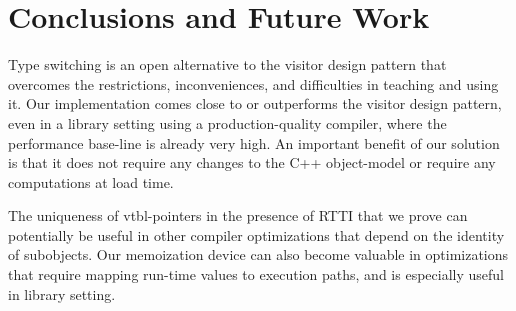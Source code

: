 \section{Conclusions and Future Work} %
\label{sec:cc}

Type switching is an open alternative to the visitor design pattern that overcomes 
the restrictions, inconveniences, and difficulties in teaching and using 
it. Our implementation comes close to or 
outperforms the visitor design pattern, even in a library setting 
using a production-quality compiler, where the performance base-line is 
already very high. An important benefit of our solution is that it does not 
require any changes to the C++ object-model or require any computations at load 
time.

The uniqueness of vtbl-pointers in the presence of RTTI that we prove can 
potentially be useful in other compiler optimizations that depend on the 
identity of subobjects. Our memoization device can also become valuable in 
optimizations that require mapping run-time values to execution paths, 
and is especially useful in library setting.

%
%
%
%
%

